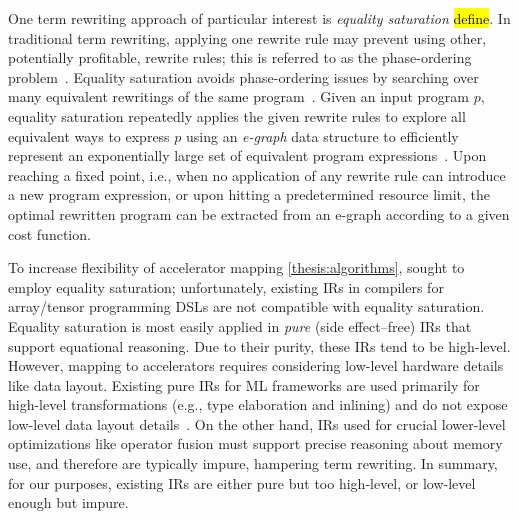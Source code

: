 One term rewriting approach
  of particular interest
  is \textit{equality saturation} \hl{define}.
In traditional term rewriting,
  applying one rewrite rule
  may prevent
  using other, potentially profitable, rewrite rules;
  this is referred to as the phase-ordering problem~\cite{whitfield1997approach}.
Equality saturation avoids
  phase-ordering issues %
  by searching over many equivalent rewritings of the same program~\cite{tate2011equality,joshi2002denali}.
Given an input program $p$, 
  equality saturation repeatedly applies 
  the given rewrite rules 
  to explore all equivalent ways to express $p$
using an \textit{e-graph} data structure
  to efficiently represent an exponentially large set of equivalent program expressions~\cite{nelson1980fast,nieuwenhuis2005proof}.
Upon reaching a fixed point, 
  i.e., when no application of any rewrite rule can introduce a new program expression,
  or upon hitting a predetermined resource limit,
  the optimal rewritten program
  can be extracted from an e-graph
  according to a given cost function.

To increase flexibility
  of accelerator mapping \cref{thesis:algorithms},
  {\TLA} sought to employ equality saturation;
  unfortunately, existing IRs in compilers for
  array/tensor programming DSLs 
  are not compatible with equality saturation.
Equality saturation is most easily applied in
  \textit{pure} (side effect--free) IRs
  that support equational reasoning.
Due to their purity, these IRs tend to be
  high-level.
However,
  mapping to accelerators requires considering
  low-level hardware details like data layout.
Existing pure IRs for ML frameworks are used
  primarily for high-level transformations
  (e.g., type elaboration and inlining)
  and do not expose low-level data layout details~\cite{relay}.
On the other hand,
  IRs used for crucial lower-level optimizations like
  operator fusion must support
  precise reasoning about memory use,
  and therefore are typically impure,
  hampering term rewriting.
In summary, for our purposes,
  existing IRs are either pure but too high-level,
  or low-level enough but impure.

